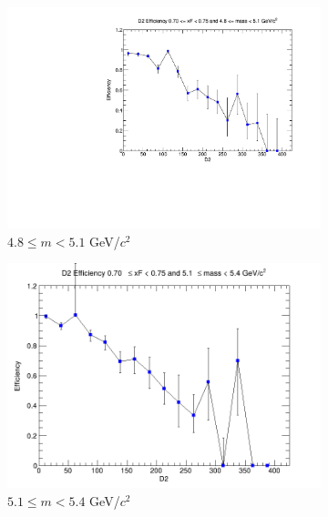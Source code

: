 \documentclass[11pt]{article}
\begin{document}
\begin{figure}[p]
\begin{subfigure}[b]{0.32\textwidth}
        \includegraphics[width=\textwidth]{./kTrackerEfficiencyPlots/D2_Efficiency_xF14_mass2.pdf}
        \caption{$4.8 \leq m < 5.1$ GeV/$c^2$}
    \end{subfigure}\vspace{0.5cm}
    \begin{subfigure}[b]{0.32\textwidth}
        \centering
        \includegraphics[width=\textwidth]{./kTrackerEfficiencyPlots/D2_Efficiency_xF14_mass3.png}
        \caption{$5.1 \leq m < 5.4$ GeV/$c^2$}
    \end{subfigure}\hfill
    \begin{subfigure}[b]{0.32\textwidth}
        \centering

\end{subfigure}
\end{figure}
\end{document}
